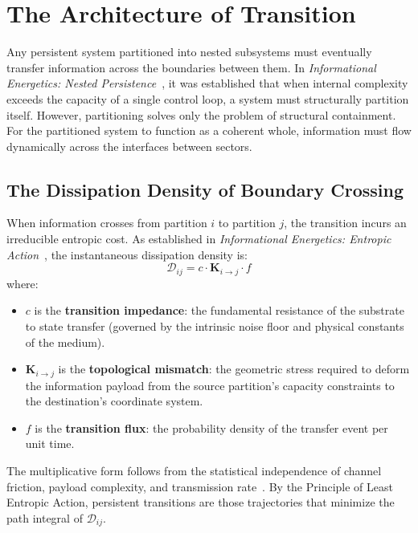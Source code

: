 \section{The Architecture of Transition}
\label{sec:architecture_of_transition}

Any persistent system partitioned into nested subsystems must eventually transfer information across the boundaries between them. In \textit{Informational Energetics: Nested Persistence}~\cite{meyer_ienested_2026}, it was established that when internal complexity exceeds the capacity of a single control loop, a system must structurally partition itself. However, partitioning solves only the problem of structural containment. For the partitioned system to function as a coherent whole, information must flow dynamically across the interfaces between sectors.

\subsection{The Dissipation Density of Boundary Crossing}

When information crosses from partition $i$ to partition $j$, the transition incurs an irreducible entropic cost. As established in \textit{Informational Energetics: Entropic Action}~\cite{meyer_ieaction_2026}, the instantaneous dissipation density is: 
$$ \mathcal{D}_{ij} = c \cdot \mathbf{K}_{i\to j} \cdot f $$
where:
\begin{itemize}
    \item $c$ is the \textbf{transition impedance}: the fundamental resistance of the substrate to state transfer (governed by the intrinsic noise floor and physical constants of the medium).
    \item $\mathbf{K}_{i\to j}$ is the \textbf{topological mismatch}: the geometric stress required to deform the information payload from the source partition's capacity constraints to the destination's coordinate system.
    \item $f$ is the \textbf{transition flux}: the probability density of the transfer event per unit time.
\end{itemize}

The multiplicative form follows from the statistical independence of channel friction, payload complexity, and transmission rate~\cite{meyer_ieaction_2026}. By the Principle of Least Entropic Action, persistent transitions are those trajectories that minimize the path integral of $\mathcal{D}_{ij}$.

